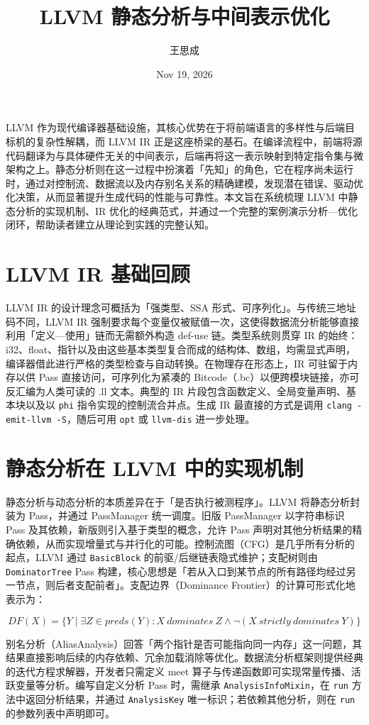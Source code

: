 \title{LLVM 静态分析与中间表示优化}
\author{王思成}
\date{Nov 19, 2026}
\maketitle
LLVM 作为现代编译器基础设施，其核心优势在于将前端语言的多样性与后端目标机的复杂性解耦，而 LLVM IR 正是这座桥梁的基石。在编译流程中，前端将源代码翻译为与具体硬件无关的中间表示，后端再将这一表示映射到特定指令集与微架构之上。静态分析则在这一过程中扮演着「先知」的角色，它在程序尚未运行时，通过对控制流、数据流以及内存别名关系的精确建模，发现潜在错误、驱动优化决策，从而显著提升生成代码的性能与可靠性。本文旨在系统梳理 LLVM 中静态分析的实现机制、IR 优化的经典范式，并通过一个完整的案例演示分析—优化闭环，帮助读者建立从理论到实践的完整认知。\par
\chapter{LLVM IR 基础回顾}
LLVM IR 的设计理念可概括为「强类型、SSA 形式、可序列化」。与传统三地址码不同，LLVM IR 强制要求每个变量仅被赋值一次，这使得数据流分析能够直接利用「定义—使用」链而无需额外构造 def-use 链。类型系统则贯穿 IR 的始终：i32、float、指针以及由这些基本类型复合而成的结构体、数组，均需显式声明，编译器借此进行严格的类型检查与自动转换。在物理存在形态上，IR 可驻留于内存以供 Pass 直接访问，可序列化为紧凑的 Bitcode（.bc）以便跨模块链接，亦可反汇编为人类可读的 .ll 文本。典型的 IR 片段包含函数定义、全局变量声明、基本块以及以 \texttt{phi} 指令实现的控制流合并点。生成 IR 最直接的方式是调用 \texttt{clang -emit-llvm -S}，随后可用 \texttt{opt} 或 \texttt{llvm-dis} 进一步处理。\par
\chapter{静态分析在 LLVM 中的实现机制}
静态分析与动态分析的本质差异在于「是否执行被测程序」。LLVM 将静态分析封装为 Pass，并通过 PassManager 统一调度。旧版 PassManager 以字符串标识 Pass 及其依赖，新版则引入基于类型的概念，允许 Pass 声明对其他分析结果的精确依赖，从而实现增量式与并行化的可能。控制流图（CFG）是几乎所有分析的起点，LLVM 通过 \texttt{BasicBlock} 的前驱/后继链表隐式维护；支配树则由 \texttt{DominatorTree} Pass 构建，核心思想是「若从入口到某节点的所有路径均经过另一节点，则后者支配前者」。支配边界（Dominance Frontier）的计算可形式化地表示为：\par
$$ DF(X)=\{Y\mid\exists Z\in preds(Y):X\ dominates\ Z\land\lnot(X\ strictly\ dominates\ Y)\} $$\par
别名分析（AliasAnalysis）回答「两个指针是否可能指向同一内存」这一问题，其结果直接影响后续的内存依赖、冗余加载消除等优化。数据流分析框架则提供经典的迭代方程求解器，开发者只需定义 meet 算子与传递函数即可实现常量传播、活跃变量等分析。编写自定义分析 Pass 时，需继承 \texttt{AnalysisInfoMixin}，在 \texttt{run} 方法中返回分析结果，并通过 \texttt{AnalysisKey} 唯一标识；若依赖其他分析，则在 \texttt{run} 的参数列表中声明即可。\par
